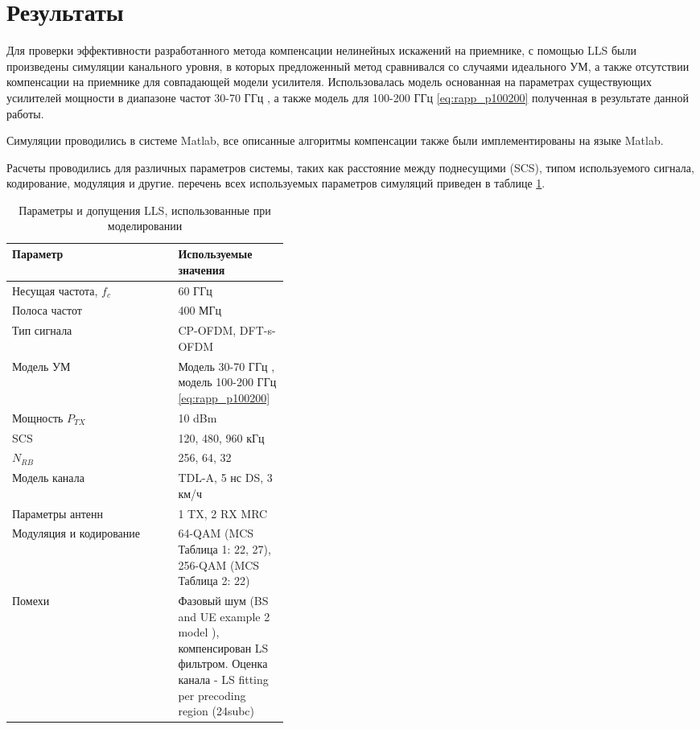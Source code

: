 \section{Результаты}
\label{sec:results}
Для проверки эффективности разработанного метода компенсации нелинейных
искажений на приемнике, с помощью LLS были произведены симуляции канального
уровня, в которых предложенный метод сравнивался со случаями идеального УМ,
а также отсутствии компенсации на приемнике для совпадающей модели
усилителя. Использовалась модель основанная на параметрах существующих
усилителей мощности в диапазоне частот 30-70 ГГц \cite{nokia163314}, а
также модель для 100-200 ГГц \ref{eq:rapp_p100200} полученная в результате
данной работы.

Симуляции проводились в системе Matlab, все описанные алгоритмы компенсации
также были имплементированы на языке Matlab.

Расчеты проводились для различных параметров системы, таких как расстояние
между поднесущими (SCS), типом используемого сигнала, кодирование,
модуляция и другие. перечень всех используемых параметров симуляций
приведен в таблице \ref{tab:lls_parameters}.
\begin{table}[h!]
    \centering
    \bgroup
    \def\arraystretch{1.5}
    \begin{tabular}{l|p{0.4\linewidth}}
    Параметр & Используемые значения \\ \hline
    Несущая частота, $f_c$ & 60 ГГц   \\ \hline
    Полоса частот &  400 МГц  \\ \hline
    Тип сигнала &  CP-OFDM, DFT-s-OFDM  \\ \hline
    Модель УМ  &  Модель 30-70 ГГц \cite{nokia163314}, модель 100-200 ГГц \ref{eq:rapp_p100200}   \\ \hline
    Мощность $P_{TX}$ &  10 dBm  \\ \hline
    SCS &  120, 480, 960 кГц  \\ \hline
    $N_{RB}$ &  256, 64, 32  \\ \hline
    Модель канала &  TDL-A, 5 нс DS, 3 км/ч  \\ \hline
    Параметры антенн &  1 TX, 2 RX MRC  \\ \hline
    Модуляция и кодирование &  64-QAM (MCS Таблица 1: 22, 27), 256-QAM (MCS Таблица 2: 22)  \\ \hline
    Помехи &  Фазовый шум (BS and UE example 2 model \cite{3gpp.38.803}),
    компенсирован LS фильтром. Оценка канала - LS fitting per precoding
    region (24subc)
    \end{tabular}
    \egroup
    \caption{Параметры и допущения LLS, использованные при моделировании}
    \label{tab:lls_parameters}
\end{table}

